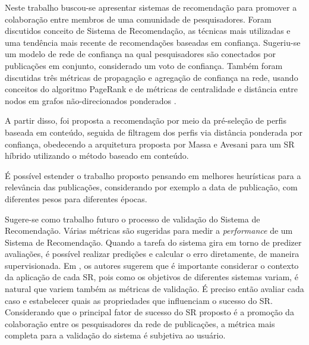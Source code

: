 \documentclass[12pt]{article}
\begin{document}
Neste trabalho buscou-se apresentar sistemas de recomendação para promover a colaboração entre membros de uma comunidade de pesquisadores. Foram discutidos conceito de Sistema de Recomendação, as técnicas mais utilizadas e uma tendência mais recente de recomendações baseadas em confiança. Sugeriu-se um modelo de rede de confiança na qual pesquisadores são conectados por publicações em conjunto, considerado um voto de confiança. Também foram discutidas três métricas de propagação e agregação de confiança  na rede, usando conceitos do algoritmo PageRank \cite{page1999pagerank} e de métricas de centralidade e distância entre nodos em grafos não-direcionados ponderados \cite{opsahl2010node}.

A partir disso, foi proposta a recomendação por meio da pré-seleção de perfis baseada em conteúdo, seguida de filtragem dos perfis 
via distância ponderada por confiança, obedecendo a arquitetura proposta por Massa e Avesani \cite{massa2004trust} para um SR híbrido utilizando o método baseado em conteúdo. 

É possível estender o trabalho proposto pensando em melhores heurísticas para a relevância das publicações, considerando por exemplo a data de publicação, com diferentes pesos para diferentes épocas.

Sugere-se como trabalho futuro o processo de validação do Sistema de Recomendação. Várias métricas são sugeridas para medir a \textit{performance} de um Sistema de Recomendação. Quando a tarefa do sistema gira em torno de predizer avaliações, é possível realizar predições e calcular o erro diretamente, de maneira supervisionada. Em \cite{shani2011evaluating}, os autores sugerem que é importante considerar o contexto da aplicação de cada SR, pois como os objetivos de diferentes sistemas variam, é natural que variem também as métricas de validação. É preciso então avaliar cada caso e estabelecer quais as propriedades que influenciam o sucesso do SR. Considerando que o principal fator de sucesso do SR  proposto é a promoção da colaboração entre os pesquisadores da rede de publicações, a métrica mais completa para a validação do sistema é subjetiva ao usuário.



\end{document}
